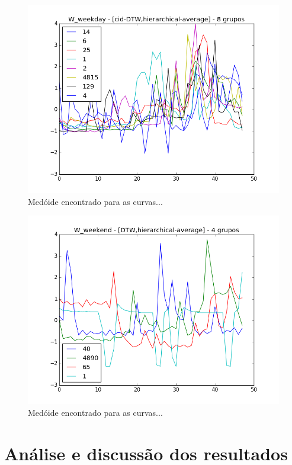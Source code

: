 \begin{figure}[h!]
	\includegraphics[width=\linewidth]{figuras/irish/2016-07-19_15:33:04.743952__irish_results/W_weekday_-_[cid-DTW,hierarchical-average]_-_8_grupos.png}
	\caption{Medóide encontrado para as curvas...}
\end{figure}

\begin{figure}[h!]
	\includegraphics[width=\linewidth]{figuras/irish/2016-07-19_15:33:04.743952__irish_results/W_weekend_-_[DTW,hierarchical-average]_-_4_grupos.png}
	\caption{Medóide encontrado para as curvas...}
\end{figure}

\section{Análise e discussão dos resultados}


